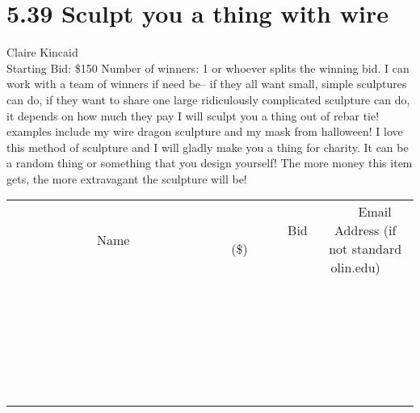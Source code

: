 \documentclass[11pt]{article}
\begin{document}
\section*{5.39 Sculpt you a thing with wire}
Claire Kincaid
\\
Starting Bid: \$150
\newline
Number of winners: 1 or whoever splits the winning bid.  I can work with a team of winners if need be-- if they all want small, simple sculptures can do, if they want to share one large ridiculously complicated sculpture can do, it depends on how much they pay
\newline
I will sculpt you a thing out of rebar tie! examples include my wire dragon sculpture and my mask from halloween!  I love this method of sculpture and I will gladly make you a thing for charity.  It can be a random thing or something that you design yourself! The more money this item gets, the more extravagant the sculpture will be!
\\[6ex]
\begin{tabular}{c c c}
~~~~~~~~~~~~~Name~~~~~~~~~~~~~ & ~~~~~~~~~Bid (\$)~~~~~~~~~  & ~~~Email Address (if not standard olin.edu)~~~\\
 & & \\
\hline
 & & \\
\hline
 & & \\
\hline
 & & \\
\hline
 & & \\
\hline
 & & \\
\hline
 & & \\
\hline
 & & \\
\hline
 & & \\
\hline
 & & \\
\hline
 & & \\
\hline
 & & \\
\hline
 & & \\
\hline
 & & \\
\hline
 & & \\
\hline
 & & \\
\hline
 & & \\
\hline
 & & \\
\hline
 & & \\
\hline
 & & \\
\hline
 & & \\
\hline
 & & \\
\hline
 & & \\
\hline
 & & \\
\hline
 & & \\
\hline
 & & \\
\hline
\end{tabular}
\newpage
\end{document}
